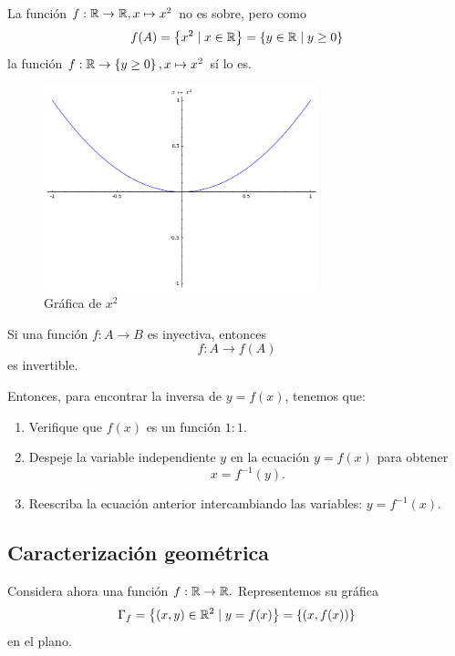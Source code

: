 \begin{problema}
	La función $f:\mathbb{R} \to \mathbb{R}, x \mapsto x^{2}$ no es sobre, pero como 
	$$f(A)=\left\{ x^2\mid x\in\mathbb{R} \right\}=\left\{ y\in \mathbb{R} \mid y\geq 0 \right\}$$
	la función $f: \mathbb{R}\to \left\{ y \geq 0 \right\}, x \mapsto x^{2}$ sí lo es.
\end{problema}




\begin{figure}
	\centering
	\includegraphics[width=8cm,keepaspectratio=true]{./md/IMG-04_resticcion.png}
	\caption{Gráfica de $x^2$}
	\label{fig:0401}
\end{figure}




\begin{proposicion}
	Si una función $f:A \to B$ es inyectiva, entonces
	$$
	f:A \to f(A)
	$$ es invertible.
\end{proposicion}



Entonces, para encontrar la inversa de $y=f(x)$, tenemos que:
\begin{enumerate}
	\item Verifique que $f(x)$ es un función $1:1.$ 
	\item Despeje la variable independiente $y$ en la ecuación $y=f(x)$ para obtener
	$$x=f^{-1}(y).$$ 
	\item Reescriba la ecuación anterior intercambiando las variables: $y=f^{-1}(x).$
\end{enumerate}







%
\subsection{Caracterización geom\'etrica}


Considera ahora una función $f:\mathbb{R} \to \mathbb{R}.$ Representemos su gráfica 
$$
\Gamma_{f}=\left\{ (x,y)\in\mathbb{R}^{2}\mid y=f(x) \right\}
=\left\{ (x,f(x)) \right\}
$$
en el plano.




